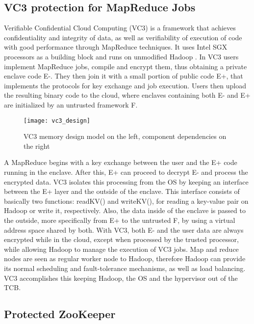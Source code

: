 \subsection{VC3 protection for MapReduce Jobs}

Verifiable Confidential Cloud Computing (VC3) \cite{vc3Paper} is a framework that achieves confidentiality and integrity of data, as well as verifiability of execution of code with good performance through MapReduce \cite{mapReduce} techniques. It uses Intel SGX processors as a building block and runs on unmodified Hadoop \cite{hadoop}.
In VC3 users implement MapReduce jobs, compile and encrypt them, thus obtaining a private enclave code E-. They then join it with a small portion of public code E+, that implements the protocols for key exchange and job execution.
Users then upload the resulting binary code to the cloud, where enclaves containing both E- and E+ are initialized by an untrusted framework F. 

\begin{figure}[htbp]
	\centering
	{\texttt{[image: vc3\_design]}}%
	\caption{VC3 memory design model on the left, component dependencies on the right}
\end{figure}

A MapReduce begins with a key exchange between the user and the E+ code running in the enclave. After this, E+ can proceed to decrypt E- and process the encrypted data. VC3 isolates this processing from the OS by keeping an interface between the E+ layer and the outside of the enclave. This interface consists of basically two functions: readKV() and writeKV(), for reading a key-value pair on Hadoop or write it, respectively. Also, the data inside of the enclave is passed to the outside, more specifically from E+ to the untrusted F, by using a virtual address space shared by both.
With VC3, both E- and the user data are always encrypted while in the cloud, except when processed by the trusted processor, while allowing Hadoop to manage the execution of VC3 jobs. Map and reduce nodes are seen as regular worker node to Hadoop, therefore Hadoop can provide its normal scheduling and fault-tolerance mechanisms, as well as load balancing. VC3 accomplishes this keeping Hadoop, the OS and the hypervisor out of the TCB.




\subsection{Protected ZooKeeper}

